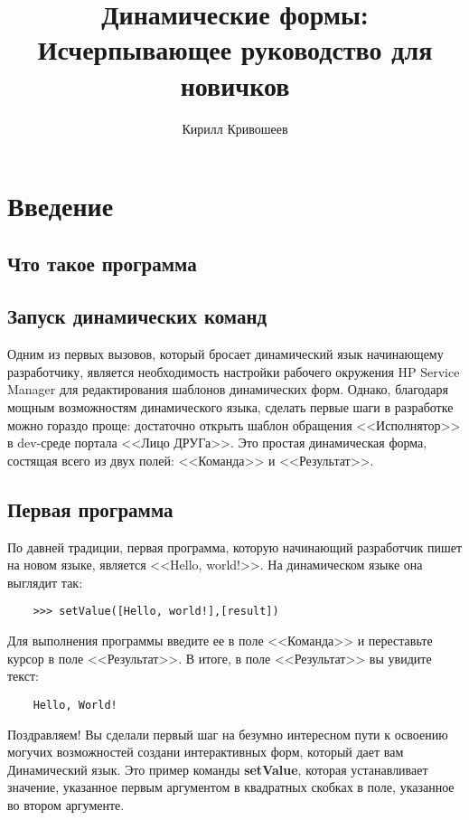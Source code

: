 \documentclass[10pt]{book}
\begin{document}
	\title{Динамические формы: Исчерпывающее руководство для новичков}
	\author{Кирилл Кривошеев}

	\maketitle
	\tableofcontents
	\mainmatter
	
	\chapter{Введение}
	
	\section{Что такое программа}
	
	\section{Запуск динамических команд}
	Одним из первых вызовов, который бросает динамический язык начинающему разработчику, является необходимость настройки рабочего окружения HP Service Manager для редактирования шаблонов динамических форм. Однако, благодаря мощным возможностям динамического языка, сделать первые шаги в разработке можно гораздо проще: достаточно открыть шаблон обращения <<Исполнятор>> в dev-среде портала <<Лицо ДРУГа>>. Это простая динамическая форма, состящая всего из двух полей: <<Команда>> и <<Результат>>.
	
	\section{Первая программа}
	
	По давней традиции, первая программа, которую начинающий разработчик пишет на новом языке, является <<Hello, world!>>. На динамическом языке она выглядит так:
	\begin{verbatim}
	>>> setValue([Hello, world!],[result])
	\end{verbatim}
	
	Для выполнения программы введите ее в поле <<Команда>> и переставьте курсор в поле <<Результат>>. В итоге, в поле <<Результат>> вы увидите текст:
	
	\begin{verbatim}
	Hello, World!
	\end{verbatim}
	
	Поздравляем! Вы сделали первый шаг на безумно интересном пути к освоению могучих возможностей создани интерактивных форм, который дает вам Динамический язык.
	Это пример команды {\bf setValue}, которая устанавливает значение, указанное первым аргументом в квадратных скобках в поле, указанное во втором аргументе.
	
\end{document}
